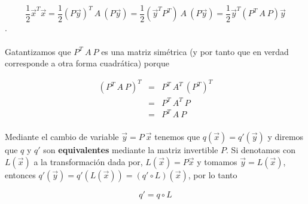 \begin{equation*}
    \frac{1}{2}\overrightarrow{x}^{T}\overrightarrow{x} = \frac{1}{2}\left(P\overrightarrow{y}\right)^{T}~A~\left(P\overrightarrow{y}\right) = \frac{1}{2}\left(\overrightarrow{y}^{T} P^{T}\right)~A~\left(P\overrightarrow{y}\right) = \frac{1}{2}\overrightarrow{y}^{T}\left(P^{T}~A~P\right)\overrightarrow{y}
\end{equation*}.

\paragraph*{}
Gatantizamos que $P^{T}~A~P$ es una matriz simétrica (y por tanto que en verdad corresponde a otra forma cuadrática) porque

\begin{eqnarray*}
\left(P^{T}~A~P\right)^{T}&=&P^{T}~A^{T}~\left(P^{T}\right)^{T}\\
&=&P^{T}~A^{T}~P\\
&=&P^{T}~A~P
\end{eqnarray*}

\paragraph*{}
Mediante el cambio de variable $\overrightarrow{y} = P~\overrightarrow{x}$ tenemos que $q(\overrightarrow{x}) = q'(\overrightarrow{y})$ y diremos que $q$ y $q'$ son \textbf{equivalentes} mediante la matriz invertible $P$. Si denotamos con $L(\overrightarrow{x})$ a la transformación dada por, $L(\overrightarrow{x}) = P\overrightarrow{x}$ y tomamos $\overrightarrow{y} = L(\overrightarrow{x})$, entonces $q'(\overrightarrow{y}) = q'\left(L(\overrightarrow{x})\right) = \left(q' \circ L\right)(\overrightarrow{x})$, por lo tanto

\begin{equation*}
q' = q \circ L
\end{equation*}

